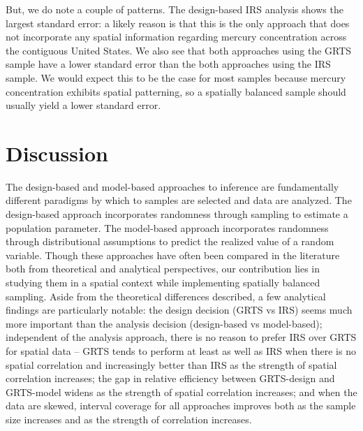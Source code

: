 \documentclass[]{elsarticle} %
\begin{document}
But, we do note a couple of patterns. The design-based IRS analysis
shows the largest standard error: a likely reason is that this is the
only approach that does not incorporate any spatial information
regarding mercury concentration across the contiguous United States. We
also see that both approaches using the GRTS sample have a lower
standard error than the both approaches using the IRS sample. We would
expect this to be the case for most samples because mercury
concentration exhibits spatial patterning, so a spatially balanced
sample should usually yield a lower standard error.

\hypertarget{sec:discussion}{%
\section{Discussion}\label{sec:discussion}}

The design-based and model-based approaches to inference are
fundamentally different paradigms by which to samples are selected and
data are analyzed. The design-based approach incorporates randomness
through sampling to estimate a population parameter. The model-based
approach incorporates randomness through distributional assumptions to
predict the realized value of a random variable. Though these approaches
have often been compared in the literature both from theoretical and
analytical perspectives, our contribution lies in studying them in a
spatial context while implementing spatially balanced sampling. Aside
from the theoretical differences described, a few analytical findings
are particularly notable: the design decision (GRTS vs IRS) seems much
more important than the analysis decision (design-based vs model-based);
independent of the analysis approach, there is no reason to prefer IRS
over GRTS for spatial data -- GRTS tends to perform at least as well as
IRS when there is no spatial correlation and increasingly better than
IRS as the strength of spatial correlation increases; the gap in
relative efficiency between GRTS-design and GRTS-model widens as the
strength of spatial correlation increases; and when the data are skewed,
interval coverage for all approaches improves both as the sample size
increases and as the strength of correlation increases.
\end{document}
